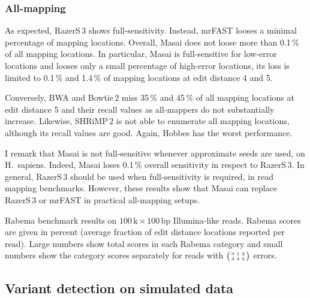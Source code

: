 \subsubsection{All-mapping}
As expected, RazerS\,3 shows full-sensitivity.
Instead, mrFAST looses a minimal percentage of mapping locations.
Overall, Masai does not loose more than 0.1\,\% of all mapping locations.
In particular, Masai is full-sensitive for low-error locations and looses only a small percentage of high-error locations, \ie its loss is limited to 0.1\,\% and 1.4\,\% of mapping locations at edit distance 4 and 5.

Conversely, BWA and Bowtie\,2 miss 35\,\% and 45\,\% of all mapping locations at edit distance 5 and their recall values as all-mappers do not substantially increase.
Likewise, SHRiMP\,2 is not able to enumerate all mapping locations, although its recall values are good.
Again, Hobbes has the worst performance.

I remark that Masai is not full-sensitive whenever approximate seeds are used, \eg on H.~sapiens. Indeed, Masai loses 0.1\,\% overall sensitivity in respect to RazerS\,3.
In general, RazerS\,3 should be used when full-sensitivity is required, \ie in read mapping benchmarks.
However, these results show that Masai can replace RazerS\,3 or mrFAST in practical all-mapping setups.

\begin{table*}[t]
  \caption[Masai results in the Rabema benchmark]
  {
  \label{tab:Rabema}
    Rabema benchmark results on $100\,\text{k}\times 100\,\text{bp}$ Illumina-like reads.
    Rabema scores are given in percent (average fraction of edit distance locations reported per read).
    Large numbers show total scores in each Rabema category and small numbers show the category scores separately for reads with $\bigl(\begin{smallmatrix}\mbox{\tiny 0}&\mbox{\tiny 1}&\mbox{\tiny 2}\\\mbox{\tiny 3}&\mbox{\tiny 4}&\mbox{\tiny 5}\end{smallmatrix}\bigr)$ errors.
    }
  \vspace{-3mm}
  \center
  \sffamily
  \resizebox{0.95\textwidth}{!}
  {
	\renewcommand{\tabcolsep}{0.8ex}
	
  }
\end{table*}

\subsection{Variant detection on simulated data}
\label{masai:evaluation:variant}


